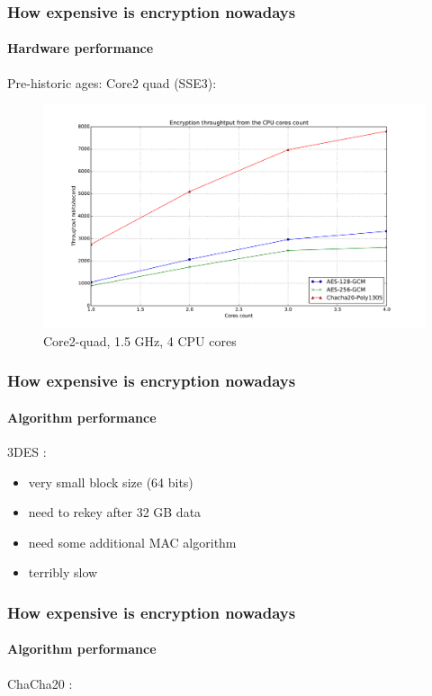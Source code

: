 \documentclass[12pt,t]{beamer}
\newcommand{\cipher}[1]{
	{\color{blue!30} #1}
}
\begin{document}
\begin{frame}
\frametitle{How expensive is encryption nowadays}
\framesubtitle{Hardware performance}
Pre-historic ages: Core2 quad (SSE3):
\begin{figure}[H]
\includegraphics[height=0.6\textheight]{perf-c2.pdf}
\caption{Core2-quad, 1.5 GHz, 4 CPU cores}
\end{figure}
\end{frame}

\begin{frame}
\frametitle{How expensive is encryption nowadays}
\framesubtitle{Algorithm performance} 
\cipher{3DES}:
	\begin{itemize}
	\item very small block size (64 bits)
	\item need to rekey after 32 GB data
	\item need some additional MAC algorithm
	\item terribly slow
	\end{itemize}
\end{frame}

\begin{frame}
\frametitle{How expensive is encryption nowadays}
\framesubtitle{Algorithm performance} 
\cipher{ChaCha20}:
\end{frame}
\end{document}
